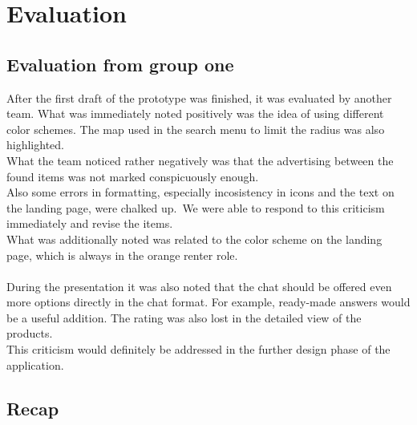 \clearpage
\section{Evaluation}

\subsection{Evaluation from group one}
After the first draft of the prototype was finished, it was evaluated by another team.
What was immediately noted positively was the idea of using different color schemes.
The map used in the search menu to limit the radius was also highlighted. \\
What the team noticed rather negatively was that the advertising between the found items was not marked conspicuously enough. \\
Also some errors in formatting, especially incosistency in icons and the text on the landing page, were chalked up.\
We were able to respond to this criticism immediately and revise the items.\
\\
What was additionally noted was related to the color scheme on the landing page, which is always in the orange renter role. \\
\\
During the presentation it was also noted that the chat should be offered even more options directly in the chat format. For example, ready-made answers would be a useful addition. The rating was also lost in the detailed view of the products. \\
This criticism would definitely be addressed in the further design phase of the application.


\subsection{Recap}

